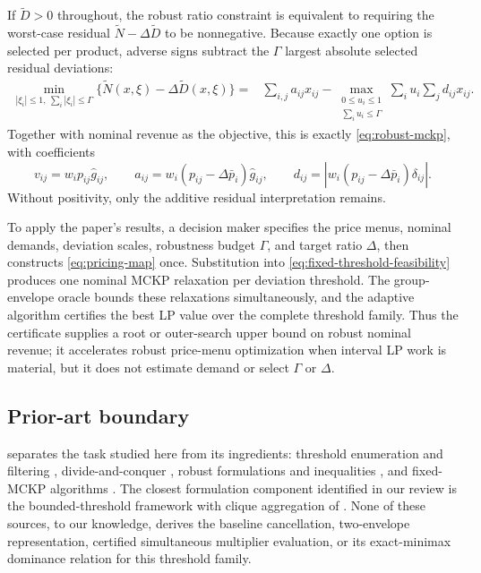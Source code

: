 \documentclass[11pt]{article}
\theoremstyle{plain}
\theoremstyle{definition}
\theoremstyle{remark}
\begin{document}
If $\widetilde D>0$ throughout, the robust ratio constraint is equivalent to requiring the worst-case residual $\widetilde N-\Delta\widetilde D$ to be nonnegative.  Because exactly one option is selected per product, adverse signs subtract the $\Gamma$ largest absolute selected residual deviations:
\begin{align}
\min_{|\xi_i|\le1,\ \sum_i|\xi_i|\le\Gamma}
\{\widetilde N(x,\xi)-\Delta\widetilde D(x,\xi)\}
={}&\sum_{i,j}a_{ij}x_{ij}
-\max_{\substack{0\le u_i\le1\\\sum_i u_i\le\Gamma}}
\sum_i u_i\sum_jd_{ij}x_{ij}. \label{eq:pricing-residual}
\end{align}
Together with nominal revenue as the objective, this is exactly \eqref{eq:robust-mckp}, with coefficients
\begin{equation}\label{eq:pricing-map}
v_{ij}=w_ip_{ij}\hat g_{ij},\qquad
a_{ij}=w_i(p_{ij}-\Delta\bar p_i)\hat g_{ij},\qquad
d_{ij}=\left|w_i(p_{ij}-\Delta\bar p_i)\delta_{ij}\right|.
\end{equation}
Without positivity, only the additive residual interpretation remains.

To apply the paper's results, a decision maker specifies the price menus, nominal demands, deviation scales, robustness budget $\Gamma$, and target ratio $\Delta$, then constructs \eqref{eq:pricing-map} once.  Substitution into \eqref{eq:fixed-threshold-feasibility} produces one nominal MCKP relaxation per deviation threshold.  The group-envelope oracle bounds these relaxations simultaneously, and the adaptive algorithm certifies the best LP value over the complete threshold family.  Thus the certificate supplies a root or outer-search upper bound on robust nominal revenue; it accelerates robust price-menu optimization when interval LP work is material, but it does not estimate demand or select $\Gamma$ or $\Delta$.

\FloatBarrier
\subsection{Prior-art boundary}

 separates the task studied here from its ingredients: threshold enumeration and filtering \citep{BertsimasSim2003,AlvarezMiranda2013,LeeKwon2014}, divide-and-conquer \citep{Hansknecht2018}, robust formulations and inequalities \citep{Atamturk2006,FischettiMonaci2012,Monaci2013,JoungPark2021,JoungOhLee2023}, and fixed-MCKP algorithms \citep{SinhaZoltners1979,Zemel1980,Dyer1984,Szkaliczki2025}.  The closest formulation component identified in our review is the bounded-threshold framework with clique aggregation of \citet{BusingGersingKoster2023}.  None of these sources, to our knowledge, derives the baseline cancellation, two-envelope representation, certified simultaneous multiplier evaluation, or its exact-minimax dominance relation for this threshold family.
\end{document}
